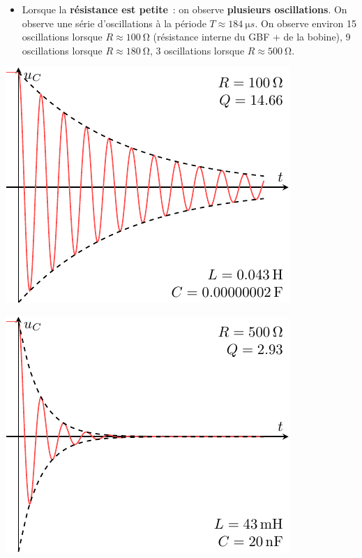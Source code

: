 \documentclass[../../main/main.tex]{subfiles}
\begin{document}
\begin{itemize}
	\item Lorsque la \textbf{résistance est petite}~: on observe \textbf{plusieurs
		      oscillations}.
	      \bigbreak
	      On observe une série d'oscillations à la période $T \approx
		      \SI{184}{\micro s}$. On observe environ 15 oscillations lorsque $R
		      \approx \SI{100}{\ohm}$ (résistance interne du GBF + de la bobine), 9
	      oscillations lorsque $R \approx \SI{180}{\ohm}$, 3 oscillations lorsque
	      $R \approx \SI{500}{\ohm}$.
\end{itemize}
\begin{minipage}{0.45\linewidth}
	\begin{center}
		\includegraphics[width=.7\linewidth]{carac-rlc-15}
	\end{center}
\end{minipage}
\hfill
\begin{minipage}{0.45\linewidth}
	\begin{center}
		\includegraphics[width=.7\linewidth]{carac-rlc-3}
	\end{center}
\end{minipage}
\end{document}
